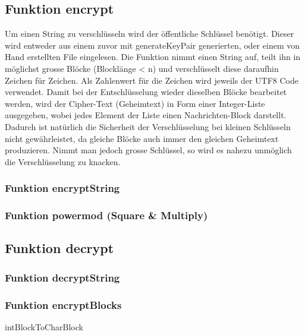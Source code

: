 \documentclass[a4paper, 11pt]{article} %
\begin{document}
\subsection{Funktion encrypt}
Um einen String zu verschlüsseln wird der öffentliche Schlüssel benötigt. Dieser wird entweder aus einem zuvor mit generateKeyPair generierten, oder einem von Hand erstellten File eingelesen.
Die Funktion nimmt einen String auf, teilt ihn in möglichst grosse Blöcke (Blocklänge < n) und verschlüsselt diese daraufhin Zeichen für Zeichen. Als Zahlenwert für die Zeichen wird jeweils der UTF8 Code verwendet.
Damit bei der Entschlüsselung wieder dieselben Blöcke bearbeitet werden, wird der Cipher-Text (Geheimtext) in Form einer Integer-Liste ausgegeben, wobei jedes Element der Liste einen Nachrichten-Block darstellt.
Dadurch ist natürlich die Sicherheit der Verschlüsselung bei kleinen Schlüsseln nicht gewährleistet, da gleiche Blöcke auch immer den gleichen Geheimtext produzieren. Nimmt man jedoch grosse Schlüssel, 
 so wird es nahezu unmöglich die Verschlüsselung zu knacken.




\subsubsection{Funktion encryptString}


\subsubsection{Funktion powermod (Square \& Multiply)}



\subsection{Funktion decrypt}

\subsubsection{Funktion decryptString}
\subsubsection{Funktion encryptBlocks}
intBlockToCharBlock


\end{document}

